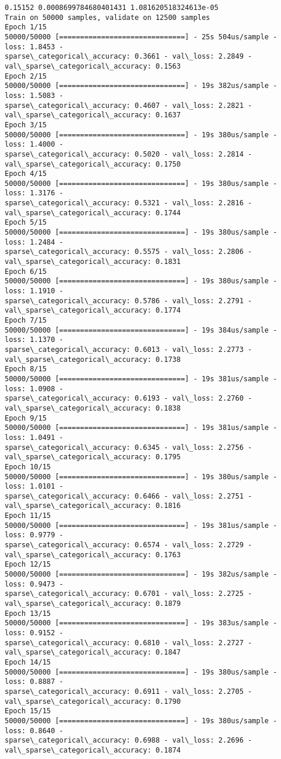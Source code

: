 \documentclass[11pt]{article}
\begin{document}
    \begin{Verbatim}[commandchars=\\\{\}]
0.15152 0.0008699784680401431 1.081620518324613e-05
Train on 50000 samples, validate on 12500 samples
Epoch 1/15
50000/50000 [==============================] - 25s 504us/sample - loss: 1.8453 -
sparse\_categorical\_accuracy: 0.3661 - val\_loss: 2.2849 -
val\_sparse\_categorical\_accuracy: 0.1563
Epoch 2/15
50000/50000 [==============================] - 19s 382us/sample - loss: 1.5083 -
sparse\_categorical\_accuracy: 0.4607 - val\_loss: 2.2821 -
val\_sparse\_categorical\_accuracy: 0.1637
Epoch 3/15
50000/50000 [==============================] - 19s 380us/sample - loss: 1.4000 -
sparse\_categorical\_accuracy: 0.5020 - val\_loss: 2.2814 -
val\_sparse\_categorical\_accuracy: 0.1750
Epoch 4/15
50000/50000 [==============================] - 19s 380us/sample - loss: 1.3176 -
sparse\_categorical\_accuracy: 0.5321 - val\_loss: 2.2816 -
val\_sparse\_categorical\_accuracy: 0.1744
Epoch 5/15
50000/50000 [==============================] - 19s 380us/sample - loss: 1.2484 -
sparse\_categorical\_accuracy: 0.5575 - val\_loss: 2.2806 -
val\_sparse\_categorical\_accuracy: 0.1831
Epoch 6/15
50000/50000 [==============================] - 19s 380us/sample - loss: 1.1910 -
sparse\_categorical\_accuracy: 0.5786 - val\_loss: 2.2791 -
val\_sparse\_categorical\_accuracy: 0.1774
Epoch 7/15
50000/50000 [==============================] - 19s 384us/sample - loss: 1.1370 -
sparse\_categorical\_accuracy: 0.6013 - val\_loss: 2.2773 -
val\_sparse\_categorical\_accuracy: 0.1738
Epoch 8/15
50000/50000 [==============================] - 19s 381us/sample - loss: 1.0908 -
sparse\_categorical\_accuracy: 0.6193 - val\_loss: 2.2760 -
val\_sparse\_categorical\_accuracy: 0.1838
Epoch 9/15
50000/50000 [==============================] - 19s 381us/sample - loss: 1.0491 -
sparse\_categorical\_accuracy: 0.6345 - val\_loss: 2.2756 -
val\_sparse\_categorical\_accuracy: 0.1795
Epoch 10/15
50000/50000 [==============================] - 19s 380us/sample - loss: 1.0101 -
sparse\_categorical\_accuracy: 0.6466 - val\_loss: 2.2751 -
val\_sparse\_categorical\_accuracy: 0.1816
Epoch 11/15
50000/50000 [==============================] - 19s 381us/sample - loss: 0.9779 -
sparse\_categorical\_accuracy: 0.6574 - val\_loss: 2.2729 -
val\_sparse\_categorical\_accuracy: 0.1763
Epoch 12/15
50000/50000 [==============================] - 19s 382us/sample - loss: 0.9473 -
sparse\_categorical\_accuracy: 0.6701 - val\_loss: 2.2725 -
val\_sparse\_categorical\_accuracy: 0.1879
Epoch 13/15
50000/50000 [==============================] - 19s 383us/sample - loss: 0.9152 -
sparse\_categorical\_accuracy: 0.6810 - val\_loss: 2.2727 -
val\_sparse\_categorical\_accuracy: 0.1847
Epoch 14/15
50000/50000 [==============================] - 19s 380us/sample - loss: 0.8887 -
sparse\_categorical\_accuracy: 0.6911 - val\_loss: 2.2705 -
val\_sparse\_categorical\_accuracy: 0.1790
Epoch 15/15
50000/50000 [==============================] - 19s 380us/sample - loss: 0.8640 -
sparse\_categorical\_accuracy: 0.6988 - val\_loss: 2.2696 -
val\_sparse\_categorical\_accuracy: 0.1874
    \end{Verbatim}
\end{document}
